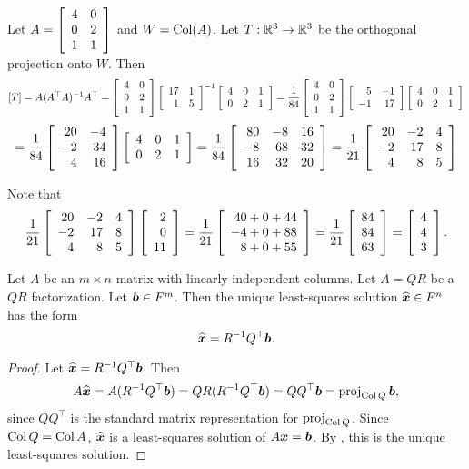 \begin{Exam} Let $A = \mtx{rr}{4&0\\0&2\\1&1}$ and $W=\col(A)$. Let $T : \R^3\to \R^3$ be the orthogonal projection onto $W$. Then 
\[[T] =A(A^\top A)^{-1}A^\top  = \mtx{rr}{4&0\\0&2\\1&1}\mtx{rr}{17&1\\1&5}^{-1} \mtx{rrrr}{4&0&1\\0&2&1} = \dfrac{1}{84}\mtx{rr}{4&0\\0&2\\1&1} \mtx{rr}{5&-1\\-1&17} \mtx{rrrr}{4&0&1\\0&2&1} \]
\[=\dfrac{1}{84}\mtx{rr}{20 &-4 \\ -2 & 34 \\ 4 & 16}\mtx{rrrr}{4&0&1\\0&2&1}= \dfrac{1}{84}\mtx{rrr}{80 & -8 & 16 \\ -8 & 68 & 32 \\ 16 & 32 & 20} = \dfrac{1}{21}\mtx{rrr}{20 & -2 & 4 \\ -2 & 17 & 8 \\ 4 & 8 & 5} \]

Note that 
\[\dfrac{1}{21}\mtx{rrr}{20 & -2 & 4 \\ -2 & 17 & 8 \\ 4 & 8 & 5}\vr{2\\0\\11} = \dfrac{1}{21}\vr{40+0+44 \\ -4 + 0 +88 \\ 8+0+55} = \dfrac{1}{21}\vr{84 \\ 84 \\ 63} = \vr{4\\4\\3}. \qedhere\]
\end{Exam}\vs

\begin{Thm} Let $A$ be an $m\times n$ matrix with linearly independent columns. Let $A = QR$ be a $QR$ factorization. Let $\bb b\in F^m$. Then the unique least-squares solution $\widehat{\bb x}\in F^n$ has the form
\[\widehat{\bb x} = R^{-1}Q^\top \bb b.\]
\end{Thm}
\begin{proof}
Let $\widehat{\bb x} = R^{-1}Q^\top \bb b$. Then 
\[A\widehat{\bb x} = A(R^{-1}Q^\top \bb b) = QR(R^{-1}Q^\top \bb b) = QQ^\top  \bb b = \proj_{\col Q} \bb b,\] since $QQ^\top$ is the standard matrix representation for $\proj_{\col Q}$. Since $\col Q = \col A$, $\widehat{\bb x}$ is a least-squares solution of $A\bb x = \bb b$. By , this is the unique least-squares solution.
\end{proof}

